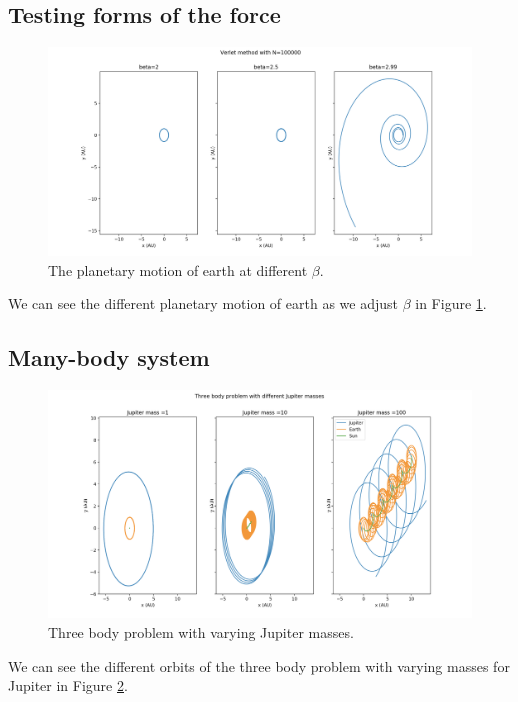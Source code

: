 \documentclass{article}
\begin{document}
\begin{multicols}{2}
\subsection{Testing forms of the force}

\begin{figure}[H]
	\centering
	\includegraphics[width=\linewidth]{Force_beta}
	\caption{The planetary motion of earth at different $\beta$.}
	\label{fig:Force_beta}
\end{figure}

We can see the different planetary motion of earth as we adjust $\beta$ in Figure \ref{fig:Force_beta}.


\subsection{Many-body system}

\begin{figure}[H]
	\centering
	\includegraphics[width=\linewidth]{Jup_mass}
	\caption{Three body problem with varying Jupiter masses.}
	\label{fig:Jup_mass}
\end{figure}

We can see the different orbits of the three body problem with varying masses for Jupiter in Figure \ref{fig:Jup_mass}. 


\end{multicols}
\end{document}
